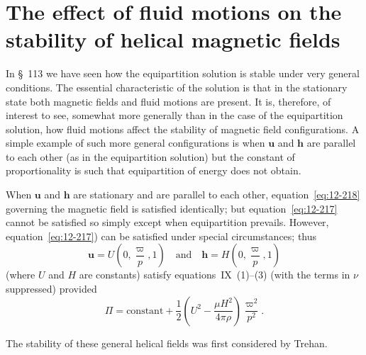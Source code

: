 \section{The effect of fluid motions on the stability of helical magnetic fields}\label{sec:114}
In \S~113 we have seen how the equipartition solution is stable under very general conditions. The essential characteristic of the solution is that in the stationary state both magnetic fields and fluid motions are present. It is, therefore, of interest to see, somewhat more generally than in the case of the equipartition solution, how fluid motions affect the stability of magnetic field configurations. A simple example of such more general configurations is when $\mathbf{u}$ and $\mathbf{h}$ are parallel to each other (as in the equipartition solution) but the constant of proportionality is such that equipartition of energy does not obtain.

When $\mathbf{u}$ and $\mathbf{h}$ are stationary and are parallel to each other, equation~\eqref{eq:12-218} governing the magnetic field is satisfied identically; but equation~\eqref{eq:12-217} cannot be satisfied so simply except when equipartition prevails. However, equation~\eqref{eq:12-217}) can be satisfied under special circumstances; thus
\begin{equation}
\label{eq:12-269}
\mathbf{u} = U\left(0, \frac{\varpi}{p}, 1\right) \quad \text{and} \quad \mathbf{h} = H\left(0, \frac{\varpi}{p}, 1\right)
\end{equation}
(where $U$ and $H$ are constants) satisfy equations~IX~(1)--(3) (with the terms in $\nu$ suppressed) provided
\begin{equation}
\label{eq:12-270}
\Pi = \text{constant} + \frac{1}{2}\left(U^2 - \frac{\mu H^2}{4\pi\rho}\right)\frac{\varpi^2}{p^2}.
\end{equation}

The stability of these general helical fields was first considered by Trehan.

